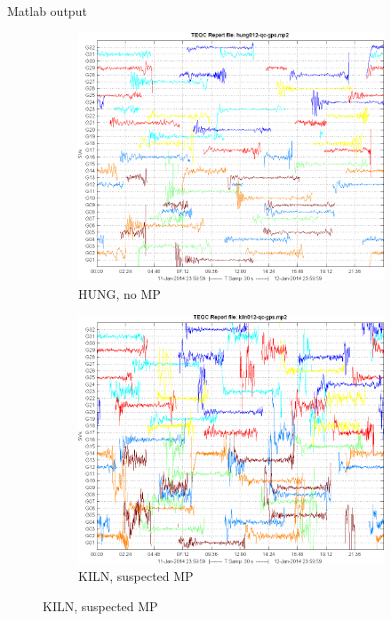 \documentclass[11pt]{beamer}
\begin{document}
\begin{frame}[allowframebreaks]{Matlab output}
	\begin{figure}
		\centering
		\begin{subfigure}{.5\textwidth}
			\centering
			\includegraphics[width=\textwidth]{pic/hung012_qc_gps_mp2.png}
			\caption{HUNG, no MP}
		\end{subfigure}%
		\begin{subfigure}{.5\textwidth}
			\centering
			\includegraphics[width=\textwidth]{pic/kiln012_qc_gps_mp2.png}
			\caption{KILN, suspected MP}

\end{subfigure}
\end{figure}
\end{frame}
\end{document}
